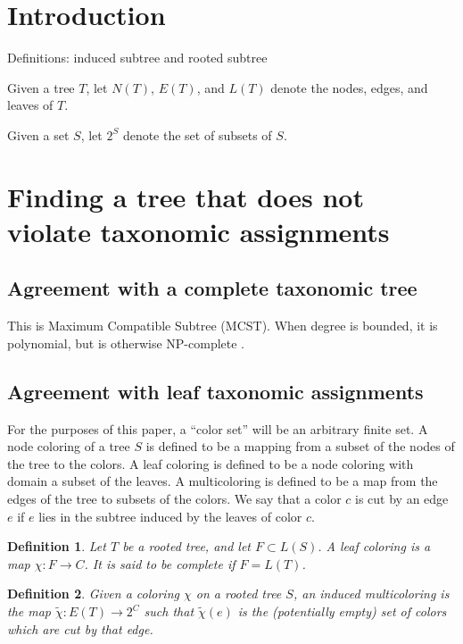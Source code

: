 \documentclass{amsart}
\newcommand{\col}{\chi}
\newcommand{\colt}{\tilde{\chi}}
\newtheorem{defn}{Definition}
\begin{document}
\section{Introduction}

Definitions: induced subtree and rooted subtree

Given a tree $T$, let $N(T)$, $E(T)$, and $L(T)$ denote the nodes, edges, and leaves of $T$.

Given a set $S$, let $2^S$ denote the set of subsets of $S$.

\section{Finding a tree that does not violate taxonomic assignments}

\subsection{Agreement with a complete taxonomic tree}
This is Maximum Compatible Subtree (MCST).
When degree is bounded, it is polynomial, but is otherwise NP-complete \cite{HeinEaComparingTrees96}.

\subsection{Agreement with leaf taxonomic assignments}

For the purposes of this paper, a ``color set'' will be an arbitrary finite set.
A node coloring of a tree $S$ is defined to be a mapping from a subset of the nodes of the tree to the colors.
A leaf coloring is defined to be a node coloring with domain a subset of the leaves.
A multicoloring is defined to be a map from the edges of the tree to subsets of the colors.
We say that a color $c$ is cut by an edge $e$ if $e$ lies in the subtree induced by the leaves of color $c$.

\begin{defn}
  Let $T$ be a rooted tree, and let $F \subset L(S)$.
  A leaf coloring is a map $\col: F \rightarrow C$.
  It is said to be complete if $F = L(T)$.
\end{defn}

\begin{defn}
  Given a coloring $\col$ on a rooted tree $S$, an induced multicoloring is the map $\colt: E(T) \rightarrow 2^C$
  such that $\colt(e)$ is the (potentially empty) set of colors which are cut by that edge.
\end{defn}
\end{document}
